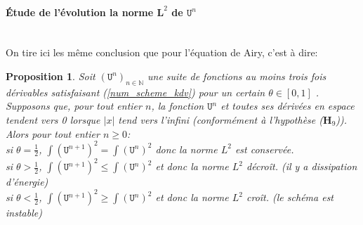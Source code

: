 \documentclass[12pt,a4paper]{article}
\newtheorem{prop}[dfn]{\textbf{Proposition}}
\numberwithin{equation}{section}
\begin{document}
\paragraph{Étude de l'évolution la norme $\textbf{L}^2$ de $\texttt{U}^n$}\,\\
On tire ici les même conclusion que pour l'équation de Airy, c'est à dire:
\begin{prop}
    Soit $(\texttt{U}^n)_{n  \in \mathbb{N}}$ une suite de fonctions au moins trois fois dérivables satisfaisant (\ref{num_scheme_kdv}) pour un certain $\theta\in[0,1]$ . Supposons que, pour tout entier $n$, la fonction $\texttt{U}^n$ et toutes ses dérivées en espace tendent vers 0 lorsque $|x|$ tend vers l'infini (conformément à l'hypothèse ($\textbf{H}_9$)). Alors pour tout entier $n \geq 0$:\\
    si $\theta = \frac{1}{2}$, $\int (\texttt{U}^{n+1})^2 = \int (\texttt{U}^{n})^2$ donc la norme $L^2$ est conservée.\\
    si $\theta > \frac{1}{2}$, $\int (\texttt{U}^{n+1})^2 \leq \int (\texttt{U}^{n})^2$ et donc la norme $L^2$ décroît. (il y a dissipation d'énergie)\\
    si $\theta < \frac{1}{2}$, $\int (\texttt{U}^{n+1})^2 \geq \int (\texttt{U}^{n})^2$ et donc la norme $L^2$ croît. (le schéma est instable)\\
\end{prop}
\end{document}
